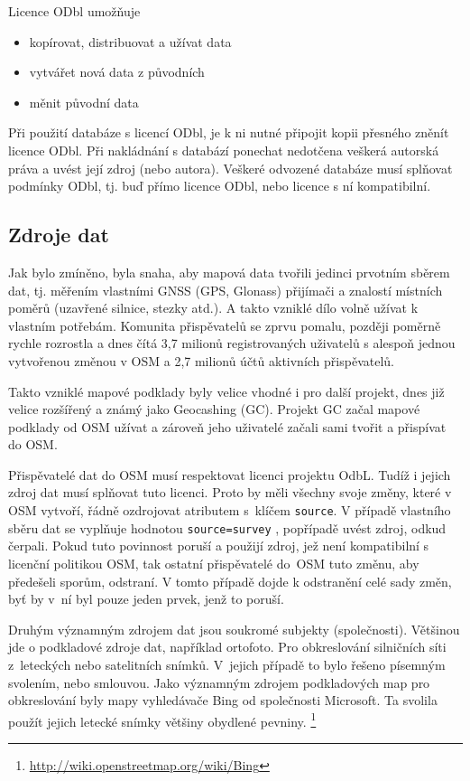 Licence ODbl umožňuje
\begin{itemize}
    \item    kopírovat, distribuovat a užívat data
    \item    vytvářet nová data z původních
    \item    měnit původní data
\end{itemize}

Při použití databáze s licencí ODbl, je k ni
nutné připojit kopii přesného zněnít licence ODbl.
Při nakládnání s databází ponechat nedotčena veškerá autorská práva a
uvést její zdroj (nebo autora).
Veškeré odvozené databáze musí splňovat podmínky ODbl,
tj. buď přímo licence ODbl, nebo licence s ní kompatibilní.
\cite{Nesetril2013thesis}

\subsection{Zdroje dat}
\label{Zdroje dat}
Jak bylo zmíněno, byla snaha, aby mapová data tvořili jedinci prvotním
sběrem dat, tj. měřením vlastními GNSS (GPS, Glonass) přijímači a
znalostí místních poměrů (uzavřené silnice, stezky atd.).  A takto
vzniklé dílo volně užívat k vlastním potřebám. Komunita přispěvatelů se
zprvu pomalu, později poměrně rychle rozrostla a dnes čítá 3,7 milionů
registrovaných uživatelů s alespoň jednou vytvořenou změnou v OSM a
2,7 milionů účtů aktivních přispěvatelů.\cite{OSMstats}

Takto vzniklé mapové podklady byly velice vhodné i pro další projekt, dnes již
velice rozšířený a známý jako Geocashing (GC). Projekt GC začal mapové
podklady od OSM užívat a zároveň jeho uživatelé začali sami tvořit a
přispívat do OSM. 

Přispěvatelé dat do OSM musí respektovat licenci projektu OdbL.
Tudíž i jejich zdroj dat musí splňovat tuto licenci. Proto by měli
všechny svoje změny, které v OSM vytvoří, řádně ozdrojovat atributem
s~klíčem 
{\tt source}.
V případě vlastního sběru dat se vyplňuje hodnotou
{\tt source=survey} ,
popřípadě uvést zdroj, odkud čerpali. Pokud tuto povinnost poruší a
použijí zdroj, jež není kompatibilní s licenční politikou OSM, tak ostatní 
přispěvatelé do~OSM tuto změnu, aby předešeli sporům, odstraní. 
V tomto případě dojde k odstranění celé sady změn, byť by v~ní byl pouze jeden prvek, jenž to poruší.

Druhým významným zdrojem dat jsou soukromé subjekty (společnosti).
Většinou jde o podkladové zdroje dat, například ortofoto. Pro obkreslování
silničních síti z~leteckých nebo satelitních snímků. V~jejich případě to
bylo řešeno písemným svolením, nebo smlouvou. Jako významným zdrojem
podkladových map pro obkreslování byly mapy vyhledávače Bing od společnosti
Microsoft. Ta svolila použít jejich letecké snímky většiny
obydlené pevniny. \footnote{\url{http://wiki.openstreetmap.org/wiki/Bing}}

